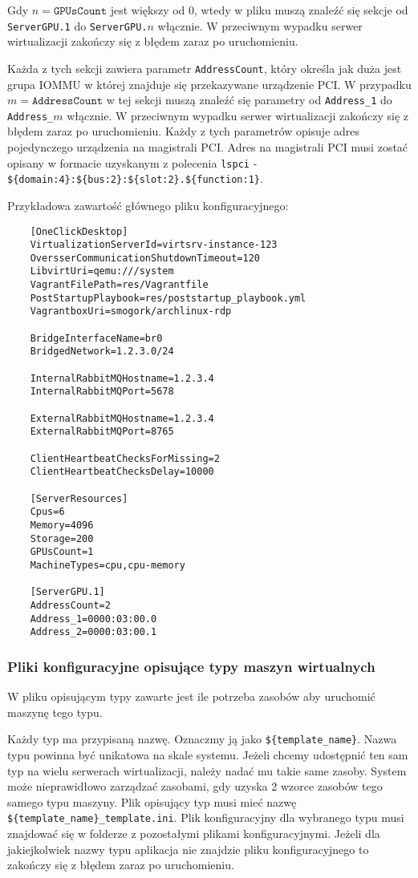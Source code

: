 \documentclass[../opis-rozwiazania.tex]{subfiles}
\begin{document}
Gdy $n = \texttt{GPUsCount}$ jest większy od 0, wtedy w pliku muszą znaleźć się sekcje od \texttt{ServerGPU.1} do \texttt{ServerGPU.$n$} włącznie.
W przeciwnym wypadku serwer wirtualizacji zakończy się z błędem zaraz po uruchomieniu.

Każda z tych sekcji zawiera parametr \texttt{AddressCount}, który określa jak duża jest grupa IOMMU w której znajduje się przekazywane urządzenie PCI.
W przypadku $m = \texttt{AddressCount}$ w tej sekcji muszą znaleźć się parametry od \texttt{Address\_1} do \texttt{Address\_$m$} włącznie.
W przeciwnym wypadku serwer wirtualizacji zakończy się z błędem zaraz po uruchomieniu.
Każdy z tych parametrów opisuje adres pojedynczego urządzenia na magistrali PCI.
Adres na magistrali PCI musi zostać opisany w formacie uzyskanym z polecenia \texttt{lspci} - \texttt{\$\{domain:4\}:\$\{bus:2\}:\$\{slot:2\}.\$\{function:1\}}.

Przykładowa zawartość głównego pliku konfiguracyjnego:
\begin{verbatim}
	[OneClickDesktop]
	VirtualizationServerId=virtsrv-instance-123
	OversserCommunicationShutdownTimeout=120
	LibvirtUri=qemu:///system
	VagrantFilePath=res/Vagrantfile
	PostStartupPlaybook=res/poststartup_playbook.yml
	VagrantboxUri=smogork/archlinux-rdp

	BridgeInterfaceName=br0
	BridgedNetwork=1.2.3.0/24

	InternalRabbitMQHostname=1.2.3.4
	InternalRabbitMQPort=5678

	ExternalRabbitMQHostname=1.2.3.4
	ExternalRabbitMQPort=8765

	ClientHeartbeatChecksForMissing=2
	ClientHeartbeatChecksDelay=10000

	[ServerResources]
	Cpus=6
	Memory=4096
	Storage=200
	GPUsCount=1
	MachineTypes=cpu,cpu-memory

	[ServerGPU.1]
	AddressCount=2
	Address_1=0000:03:00.0
	Address_2=0000:03:00.1
\end{verbatim}

\subsubsection{Pliki konfiguracyjne opisujące typy maszyn wirtualnych}
W pliku opisującym typy zawarte jest ile potrzeba zasobów aby uruchomić maszynę tego typu.

Każdy typ ma przypisaną nazwę. Oznaczmy ją jako \texttt{\$\{template\_name\}}.
Nazwa typu powinna być unikatowa na skale systemu.
Jeżeli chcemy udostępnić ten sam typ na wielu serwerach wirtualizacji, należy nadać mu takie same zasoby.
System może nieprawidłowo zarządzać zasobami, gdy uzyska 2 wzorce zasobów tego samego typu maszyny.
Plik opisujący typ musi mieć nazwę \texttt{\$\{template\_name\}\_template.ini}.
Plik konfiguracyjny dla wybranego typu musi znajdować się w folderze z pozostałymi plikami konfiguracyjnymi.
Jeżeli dla jakiejkolwiek nazwy typu aplikacja nie znajdzie pliku konfiguracyjnego to zakończy się z błędem zaraz po uruchomieniu.
\end{document}
